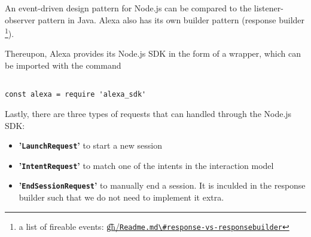 

An event-driven design pattern for Node.js can be compared to the listener-observer pattern in Java. Alexa also has its own builder pattern (response builder \footnote{a list of fireable events: %
	 \href{https://github.com/alexa/alexa-skills-kit-sdk-for-nodejs/blob/master/Readme.md\#response-vs-responsebuilder}{\t{gh}/\lstinline|Readme.md\#response-vs-responsebuilder|}}).


Thereupon, Alexa provides its Node.js SDK in the form of a wrapper, which can be imported with the command
\begin{verbatim}

const alexa = require 'alexa_sdk'
\end{verbatim}




Lastly, there are three types of requests that can handled through the Node.js SDK:

	
	\begin{itemize}
		\item \textbf{'\texttt{LaunchRequest}'} to start a new session
		\item \textbf{'\texttt{IntentRequest}'} to match one of the intents in the interaction model
		\item \textbf{'\texttt{EndSessionRequest}'} to manually end a session. It is inculded in the response builder such that we do not need to implement it extra.
		
	\end{itemize}



